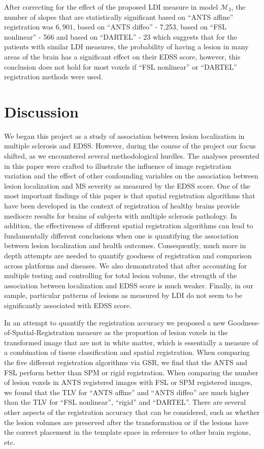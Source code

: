 \documentclass[10pt]{article}
\begin{document}
After correcting for the effect of the proposed LDI measure in model $\mathcal{M}_3$, the number of slopes that are statistically significant based on ``ANTS affine'' registration was $6,901$, based on ``ANTS diffeo'' - 7,253, based on ``FSL nonlinear'' - 566 and based on ``DARTEL'' - 23 which suggests that for the patients with similar LDI measures, the probability of having a lesion in many areas of the brain has a significant effect on their EDSS score, however, this conclusion does not hold for most voxels if ``FSL nonlinear'' or ``DARTEL'' registration methods were used. 



\section*{Discussion}

We began this project  as a study of association between lesion
localization in multiple  sclerosis and EDSS. However, during the
course of the project our focus shifted, as we encountered several methodological hurdles. The analyses presented in this paper were crafted to illustrate the influence of image registration variation and the effect of other confounding variables on the association between lesion localization and MS severity as measured by the EDSS score. One of the most important findings of this paper is that spatial registration algorithms that have been developed
in the context of registration of healthy brains provide mediocre results for brains of subjects
with multiple sclerosis pathology. In addition, the effectiveness of different spatial registration
algorithms can lead to fundamentally different conclusions when one is
quantifying the association between lesion localization and health
outcomes. Consequently, much more in depth attempts are needed to quantify
goodness of registration and comparison across platforms and
diseases. We also demonstrated that after accounting for multiple testing and controlling
for total lesion volume, the strength of the association between
localization and EDSS score is much weaker. Finally, in our sample, particular patterns of
lesions as measured by LDI do not seem to be significantly associated with EDSS score.

In an attempt to quantify the registration accuracy we proposed a
new Goodness-of-Spatial-Registration measure as the
proportion of lesion voxels in the transformed image that are not in
white matter, which is essentially a measure of a combination of tissue classification and spatial registration. When comparing the five different registration
algorithms via GSR, we find that the ANTS and FSL perform better
than SPM or rigid registration. When comparing the number of lesion
voxels in ANTS registered images with FSL or SPM registered images, we found
that the TLV for ``ANTS affine'' and ``ANTS diffeo'' are much higher
than the TLV for ``FSL nonlinear'', ``rigid'' and ``DARTEL''. There are several
other aspects of the registration accuracy that can be considered,
such as whether the lesion volumes are preserved after the
transformation or if the lesions have the correct placement in the
template space in reference to other brain regions, etc.
\end{document}
